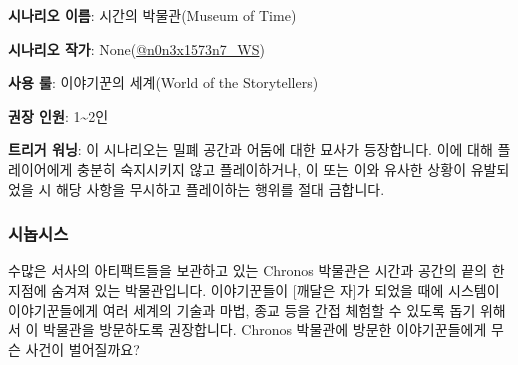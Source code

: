 \documentclass{report}
\begin{document}
	\textbf{시나리오 이름}: 시간의 박물관(Museum of Time)
	
	\textbf{시나리오 작가}: None(\href{https://www.twitter.com/n0n3x1573n7_WS}{@n0n3x1573n7\_WS})
	
	\textbf{사용 룰}: 이야기꾼의 세계(World of the Storytellers)
	
	\textbf{권장 인원}: 1\textasciitilde2인
	
	\textbf{트리거 워닝}: 이 시나리오는 밀폐 공간과 어둠에 대한 묘사가 등장합니다. 이에 대해 플레이어에게 충분히 숙지시키지 않고 플레이하거나, 이 또는 이와 유사한 상황이 유발되었을 시 해당 사항을 무시하고 플레이하는 행위를 절대 금합니다.
	
	\subsubsection*{시놉시스}
	
	수많은 서사의 아티팩트들을 보관하고 있는 Chronos 박물관은 시간과 공간의 끝의 한 지점에 숨겨져 있는 박물관입니다. 이야기꾼들이 [깨달은 자]가 되었을 때에 시스템이 이야기꾼들에게 여러 세계의 기술과 마법, 종교 등을 간접 체험할 수 있도록 돕기 위해서 이 박물관을 방문하도록 권장합니다. Chronos 박물관에 방문한 이야기꾼들에게 무슨 사건이 벌어질까요?
\end{document}
